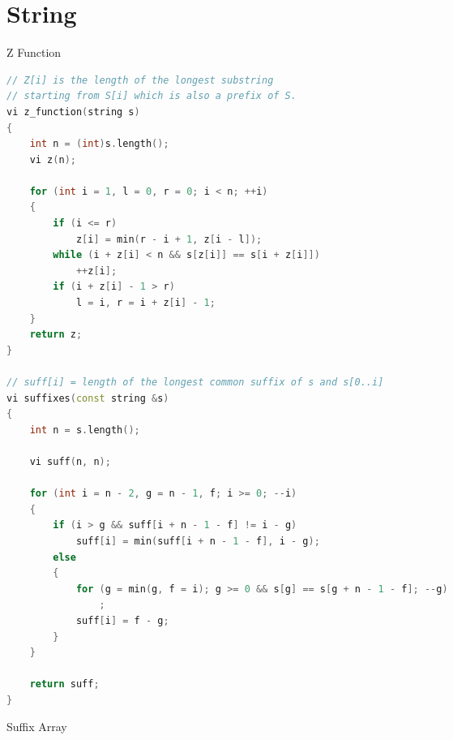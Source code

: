\documentclass[leter]{amsart}
\begin{document}
\section{String}
Z Function
\begin{multicols}{2}
\begin{lstlisting}[language=C++]
// Z[i] is the length of the longest substring
// starting from S[i] which is also a prefix of S.
vi z_function(string s)
{
    int n = (int)s.length();
    vi z(n);

    for (int i = 1, l = 0, r = 0; i < n; ++i)
    {
        if (i <= r)
            z[i] = min(r - i + 1, z[i - l]);
        while (i + z[i] < n && s[z[i]] == s[i + z[i]])
            ++z[i];
        if (i + z[i] - 1 > r)
            l = i, r = i + z[i] - 1;
    }
    return z;
}

// suff[i] = length of the longest common suffix of s and s[0..i]
vi suffixes(const string &s)
{
    int n = s.length();

    vi suff(n, n);

    for (int i = n - 2, g = n - 1, f; i >= 0; --i)
    {
        if (i > g && suff[i + n - 1 - f] != i - g)
            suff[i] = min(suff[i + n - 1 - f], i - g);
        else
        {
            for (g = min(g, f = i); g >= 0 && s[g] == s[g + n - 1 - f]; --g)
                ;
            suff[i] = f - g;
        }
    }

    return suff;
}

\end{lstlisting}
\end{multicols}
Suffix Array
\end{document}
